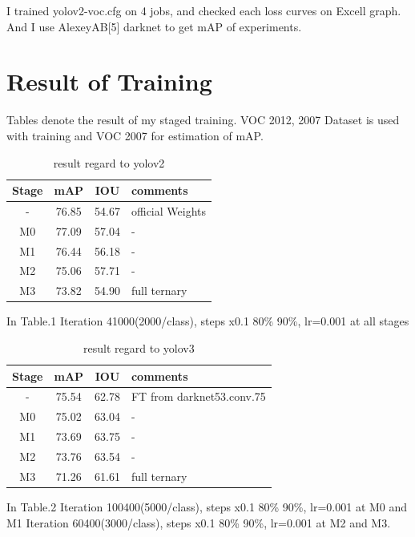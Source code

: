 \documentclass[twocolumn]{article}
\begin{document}
I trained yolov2-voc.cfg on 4 jobs, and checked each loss curves on Excell graph.
And I use AlexeyAB[5] darknet to get mAP of experiments.

\section{Result of Training}

Tables denote the result of my staged training.
VOC 2012, 2007 Dataset is used with training and VOC 2007 for estimation of mAP.

\begin{table}[htbp]
 \centering
 \begin{tabular}{c|c|c|l}
  Stage & mAP & IOU & comments \\ \hline\hline
  -        & 76.85 & 54.67 & official Weights \\ \hline
  M0       & 77.09 & 57.04 & -                \\ \hline
  M1       & 76.44 & 56.18 & -                \\ \hline
  M2       & 75.06 & 57.71 & -                \\ \hline
  M3       & 73.82 & 54.90 & full ternary     \\ \hline\hline
 \end{tabular}
 \caption{result regard to yolov2}
 \label{tb:yolov2}
\end{table}

In Table.1 Iteration 41000(2000/class), steps x0.1 80\% 90\%, lr=0.001 at all stages

\begin{table}[htbp]
 \centering
 \begin{tabular}{c|c|c|l}
  Stage & mAP & IOU & comments \\ \hline\hline
  -        & 75.54 & 62.78 & FT from darknet53.conv.75 \\ \hline
  M0       & 75.02 & 63.04 & -                \\ \hline
  M1       & 73.69 & 63.75 & -                \\ \hline
  M2       & 73.76 & 63.54 & -                \\ \hline
  M3       & 71.26 & 61.61 & full ternary     \\ \hline\hline
 \end{tabular}
 \caption{result regard to yolov3}
 \label{tb:yolov3}
\end{table}

In Table.2 Iteration 100400(5000/class), steps x0.1 80\% 90\%, lr=0.001 at M0 and M1
Iteration 60400(3000/class), steps x0.1 80\% 90\%, lr=0.001 at M2 and M3.
\end{document}
